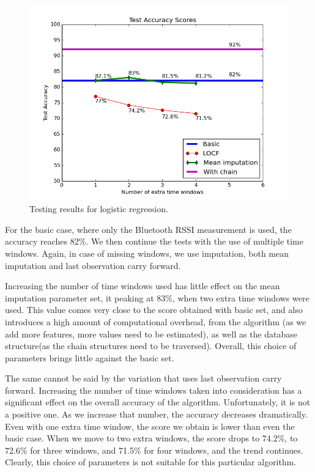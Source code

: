 \begin{figure}[h]
	\begin{center}
		\includegraphics[scale=0.7]{figures/logic_tot.png}
	\end{center}
	
	\caption{Testing results for logistic regression.}
	\label{pic:logic_tot}

\end{figure}

For the basic case, where only the Bluetooth RSSI measurement is used, the accuracy reaches 82\%. We then continue the tests with the use of multiple time windows. Again, in case of missing windows, we use imputation, both mean imputation and last observation carry forward. 

Increasing the number of time windows used has little effect on the mean imputation parameter set, it peaking at 83\%, when two extra time windows were used. This value comes very close to the score obtained with basic set, and also introduces a high amount of computational overhead, from the algorithm (as we add more features, more values need to be estimated), as well as the database structure(as the chain structures need to be traversed). Overall, this choice of parameters brings little against the basic set.

The same cannot be said by the variation that uses last observation carry forward. Increasing the number of time windows taken into consideration has a significant effect on the overall accuracy of the algorithm. Unfortunately, it is not a positive one. As we increase that number, the accuracy decreases dramatically. Even with one extra time window, the score we obtain is lower than even the basic case. When we move to two extra windows, the score drops to 74.2\%, to 72.6\% for three windows, and 71.5\% for four windows, and the trend continues. Clearly, this choice of parameters is not suitable for this particular algorithm. 

